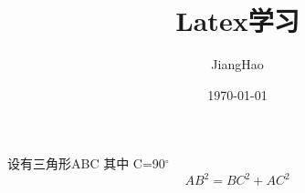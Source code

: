 \documentclass[UTF8]{article}
\title{ Latex学习}
\author{JiangHao}
\date{\today}
\newcommand\degree{^\circ}
\begin{document}
    \maketitle
    设有三角形ABC 其中 C=90$\degree$
    \begin{equation}%
        AB^2 = BC^2 + AC^2
    \end{equation}
\end{document}
